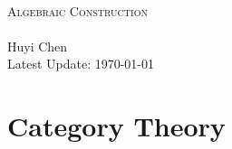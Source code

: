 \documentclass{report}
\begin{document}
\begin{center}
	~\\
	\vspace{6em}
	{\fontsize{34}{48}\selectfont\textsc{Algebraic Construction}}
	~\\
	\vspace{2.5em}
	{\Large }
	~\\
	\vspace{6em}
	\textsf{\Large Huyi Chen}
	~\\
	\vspace{5in}
	{\large Latest Update: \today}
\end{center}

\makeatletter
\MHInternalSyntaxOn
\def\MT_leftarrow_fill:{%
  \arrowfill@\leftarrow\relbar\relbar}
\def\MT_rightarrow_fill:{%
  \arrowfill@\relbar\relbar\rightarrow}
\newcommand{\xrightleftarrows}[2][]{\mathrel{%
  \raise.55ex\hbox{%
    $\ext@arrow 0359\MT_rightarrow_fill:{\phantom{#1}}{#2}$}%
  \setbox0=\hbox{%
    $\ext@arrow 3095\MT_leftarrow_fill:{#1}{\phantom{#2}}$}%
  \kern-\wd0 \lower.55ex\box0}}
\MHInternalSyntaxOff
\makeatother
\newcommand{\spec}{\operatorname{Spec}}
\newcommand{\midv}{\,\middle\vert\,}
\newpage
\tableofcontents


\chapter{Category Theory}
\end{document}
